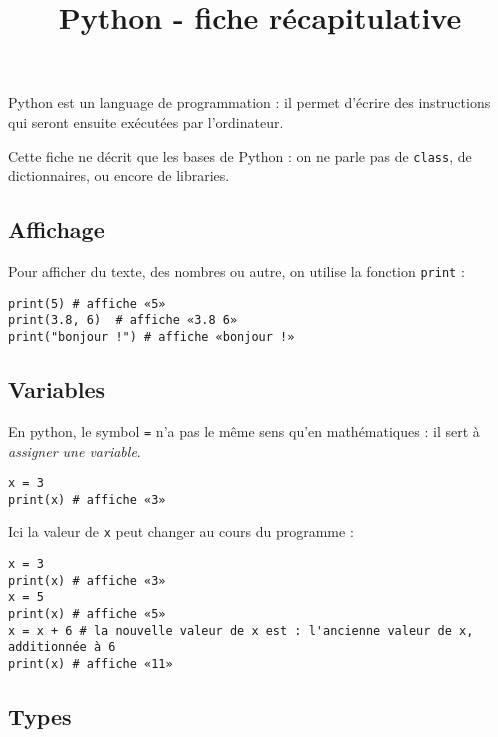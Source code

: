 \documentclass[
	classe=$2^{de}$,
	headerTitle=Fiche\space récapitulative
]
{informatique}
\title{Python - fiche récapitulative}
\begin{document}
\maketitle

\begin{tcolorbox}
	Python est un language de programmation : il permet d'écrire des instructions qui seront ensuite exécutées par l'ordinateur.

	Cette fiche ne décrit que les bases de Python : on ne parle pas de \texttt{class}, de dictionnaires, ou encore de libraries.
\end{tcolorbox}

\subsection*{Affichage}

Pour afficher du texte, des nombres ou autre, on utilise la fonction \texttt{print} :
\begin{lstlisting}
print(5) # affiche «5»
print(3.8, 6)  # affiche «3.8 6»
print("bonjour !") # affiche «bonjour !»
\end{lstlisting}

\subsection*{Variables}

En python, le symbol \texttt{=} n'a pas le même sens qu'en mathématiques : il sert à \textit{assigner une variable}.

\begin{lstlisting}
x = 3
print(x) # affiche «3»
\end{lstlisting}

Ici la valeur de \texttt{x} peut changer au cours du programme :

\begin{lstlisting}
x = 3
print(x) # affiche «3»
x = 5
print(x) # affiche «5»
x = x + 6 # la nouvelle valeur de x est : l'ancienne valeur de x, additionnée à 6
print(x) # affiche «11»
\end{lstlisting}

\subsection*{Types}
\end{document}

